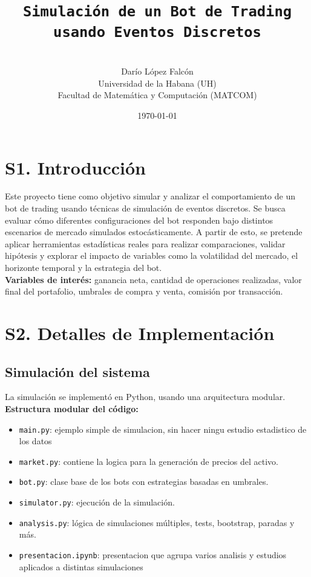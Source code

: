 \documentclass[a4paper,12pt]{article}
\title{\texttt{Simulación de un Bot de Trading \\usando Eventos Discretos}}
\author{\\Darío López Falcón \\ Universidad de la Habana (UH) \\ Facultad de Matemática 
y Computación (MATCOM)}
\date{\today}
\begin{document}
\maketitle

\section*{S1. Introducción}

Este proyecto tiene como objetivo simular y analizar el comportamiento de un bot de trading 
usando técnicas de simulación de eventos discretos. Se busca evaluar cómo diferentes 
configuraciones del bot responden bajo distintos escenarios de mercado simulados estocásticamente. 
A partir de esto, se pretende aplicar herramientas estadísticas reales para realizar comparaciones, 
validar hipótesis y explorar el impacto de variables como la volatilidad del mercado, el horizonte 
temporal y la estrategia del bot.\\

\textbf{Variables de interés:} ganancia neta, cantidad de operaciones realizadas, 
valor final del portafolio, umbrales de compra y venta, comisión por transacción.


\section*{S2. Detalles de Implementación}

\subsection*{Simulación del sistema}
La simulación se implementó en Python, usando una arquitectura modular.\\

\textbf{Estructura modular del código:}
\begin{itemize}
\item \texttt{main.py}: ejemplo simple de simulacion, sin hacer ningu estudio estadistico de los datos
\item \texttt{market.py}: contiene la logica para la generación de precios del activo.
\item \texttt{bot.py}: clase base de los bots con estrategias basadas en umbrales.
\item \texttt{simulator.py}: ejecución de la simulación.
\item \texttt{analysis.py}: lógica de simulaciones múltiples, tests, bootstrap, paradas y más.
\item \texttt{presentacion.ipynb}: presentacion que agrupa  varios analisis y estudios aplicados a distintas simulaciones\\
\end{itemize}
\end{document}
